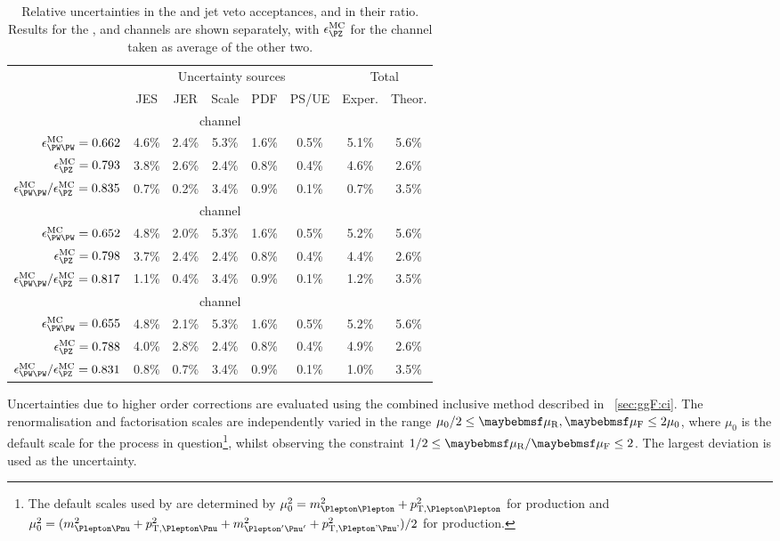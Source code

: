 \begin{table}[t]
	\begin{tabular}{r|ccccc|cc}
		\toprule
		& \multicolumn{5}{c|}{Uncertainty sources} & \multicolumn{2}{c}{Total} \\
		& JES & JER & Scale & PDF & PS/UE & Exper. & Theor. \\
		\midrule
		\multicolumn{8}{c}{\emch channel} \\
		\midrule
		$\epsilon^{\text{MC}}_{\WW} = 0.662$ 
		& 4.6\% & 2.4\% & 5.3\% & 1.6\% & 0.5\% & 5.1\% & 5.6\% \\
		$\epsilon^{\text{MC}}_{\PZ} = 0.793$ 
		& 3.8\% & 2.6\% & 2.4\% & 0.8\% & 0.4\% & 4.6\% & 2.6\% \\
		$\epsilon^{\text{MC}}_{\WW} / \epsilon^{\text{MC}}_{\PZ} = 0.835$ 
		& 0.7\% & 0.2\% & 3.4\% & 0.9\% & 0.1\% & 0.7\% & 3.5\% \\
		\midrule
		\multicolumn{8}{c}{\eech channel} \\
		\midrule
		$\epsilon^{\text{MC}}_{\WW} = 0.652$ 
		& 4.8\% & 2.0\% & 5.3\% & 1.6\% & 0.5\% & 5.2\% & 5.6\% \\
		$\epsilon^{\text{MC}}_{\PZ} = 0.798$ 
		& 3.7\% & 2.4\% & 2.4\% & 0.8\% & 0.4\% & 4.4\% & 2.6\% \\
		$\epsilon^{\text{MC}}_{\WW} / \epsilon^{\text{MC}}_{\PZ} = 0.817$ 
		& 1.1\% & 0.4\% & 3.4\% & 0.9\% & 0.1\% & 1.2\% & 3.5\% \\
		\midrule
		\multicolumn{8}{c}{\mmch channel} \\
		\midrule
		$\epsilon^{\text{MC}}_{\WW} = 0.655$ 
		& 4.8\% & 2.1\% & 5.3\% & 1.6\% & 0.5\% & 5.2\% & 5.6\% \\
		$\epsilon^{\text{MC}}_{\PZ} = 0.788$ 
		& 4.0\% & 2.8\% & 2.4\% & 0.8\% & 0.4\% & 4.9\% & 2.6\% \\
		$\epsilon^{\text{MC}}_{\WW} / \epsilon^{\text{MC}}_{\PZ} = 0.831$ 
		& 0.8\% & 0.7\% & 3.4\% & 0.9\% & 0.1\% & 1.0\% & 3.5\% \\
		\bottomrule
	\end{tabular}
	\caption{Relative uncertainties in the \WW and \PZ jet veto acceptances, and in their 
	ratio. Results for the \eech, \mmch and \emch channels are shown separately, with 
	$\epsilon^{\text{MC}}_{\PZ}$ for the \emch channel taken as average of the other two.}
	\label{tab:ww:jetveto_unc}
\end{table}

Uncertainties due to higher order corrections are evaluated using the combined inclusive 
method described in \Section~\ref{sec:ggF:ci}. The renormalisation and factorisation 
scales are independently varied in the range $\mu_0/2 \leq \mur,\muf \leq 2\mu_0$, where 
$\mu_0$ is the default scale for the process in question\footnote{
	The default scales used by \mcatnlo are determined by 
	$\mu_0^2 = m_{\Plepton\Plepton}^2 + p_{\text{T,\HepProcess{\Plepton\Plepton}}}^2$ 
	for \PZ production and 
	$\mu_0^2 = (m_{\Plepton\Pnu}^2 + p_{\text{T,\HepProcess{\Plepton\Pnu}}}^2 + 
	m_{\Plepton'\Pnu'}^2 + p_{\text{T,\HepProcess{\Plepton'\Pnu'}}}^2) / 2$
	for \WW production.
}, whilst observing the constraint $1/2 \leq \mur/\muf \leq 2$. The largest deviation is 
used as the uncertainty.

